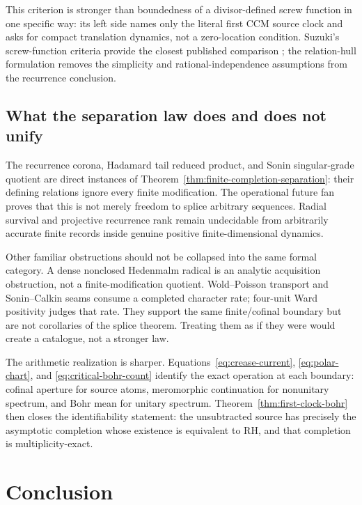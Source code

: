 \documentclass[11pt]{article}
\theoremstyle{definition}
\theoremstyle{remark}
\begin{document}
This criterion is stronger than boundedness of a divisor-defined screw function in one specific
way: its left side names only the literal first CCM source clock and asks for compact translation
dynamics, not a zero-location condition.  Suzuki's screw-function criteria provide the closest
published comparison \cite{Suzuki2023,Suzuki2026}; the relation-hull formulation removes the
simplicity and rational-independence assumptions from the recurrence conclusion.


\subsection{What the separation law does and does not unify}

The recurrence corona, Hadamard tail reduced product, and Sonin singular-grade quotient are direct
instances of Theorem~\ref{thm:finite-completion-separation}: their defining relations ignore every
finite modification.  The operational future fan proves that this is not merely freedom to splice
arbitrary sequences.  Radial survival and projective recurrence rank remain undecidable from
arbitrarily accurate finite records inside genuine positive finite-dimensional dynamics.

Other familiar obstructions should not be collapsed into the same formal category.  A dense
nonclosed Hedenmalm radical is an analytic acquisition obstruction, not a finite-modification
quotient.  Wold--Poisson transport and Sonin--Calkin seams consume a completed character rate;
four-unit Ward positivity judges that rate.  They support the same finite/cofinal boundary but are
not corollaries of the splice theorem.  Treating them as if they were would create a catalogue,
not a stronger law.

The arithmetic realization is sharper.  Equations~\eqref{eq:crease-current},
\eqref{eq:polar-chart}, and \eqref{eq:critical-bohr-count} identify the exact operation at each
boundary: cofinal aperture for source atoms, meromorphic continuation for nonunitary spectrum,
and Bohr mean for unitary spectrum.  Theorem~\ref{thm:first-clock-bohr} then closes the
identifiability statement: the unsubtracted source has precisely the asymptotic completion whose
existence is equivalent to RH, and that completion is multiplicity-exact.

\section{Conclusion}
\end{document}
